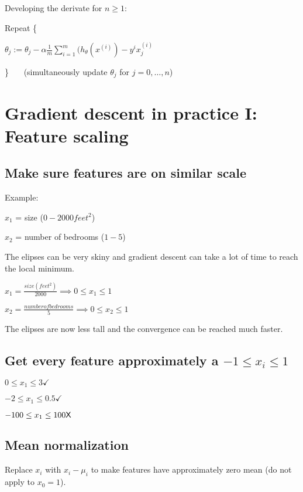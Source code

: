 \documentclass[a4paper]{report}
\begin{document}
      Developing the derivate for $n \geq 1$:

      Repeat \{

      \hspace{1cm} $\theta_{j} := \theta_{j} - \alpha\frac{1}{m}\sum_{i=1}^{m}(h_{\theta}(x^{(i)}) - y^{i}x^{(i)}_{j}$

      \} \ \ \ (simultaneously update $\theta_{j}$ for $j = 0, \ldots, n$)

    \section{Gradient descent in practice I: Feature scaling}

      \subsection{Make sure features are on similar scale}
        
        Example:

        $x_{1}$ = size ($0-2000 feet^{2}$)

        $x_{2}$ = number of bedrooms ($1-5$)

        The elipses can be very skiny and gradient descent can take a lot of time to reach the local minimum.

        $x_{1} = \frac{size (feet^{2})}{2000} \implies 0 \leq x_{1} \leq 1$
        
        $x_{2} = \frac{number of bedrooms}{5} \implies 0 \leq x_{2} \leq 1$

        The elipses are now less tall and the convergence can be reached much faster.

      \subsection{Get every feature approximately a $-1 \leq x_{i} \leq 1$}

      $0 \leq x_{1} \leq 3 \checkmark$

      $-2 \leq x_{1} \leq 0.5 \checkmark$

      $-100 \leq x_{1} \leq 100 \text{\sffamily X}$

      \subsection{Mean normalization}

      Replace $x_{i}$ with $x_{i} - \mu_{i}$ to make features have approximately zero mean (do not apply to $x_{0} = 1$).
\end{document}
